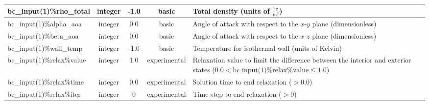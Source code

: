 \documentclass[letterpaper,10pt]{article}
\newcommand{\slbsc}{basic}
\newcommand{\slxtl}{experimental}
\newcommand{\typint}{integer}
\newcommand{\typflt}{integer}
\newcommand{\minorline}{\hline}
\newlength{\colEwidth}
\newcommand{\descriptionbegin}{}
\newcommand{\descriptionend}{\\ \minorline}
\begin{document}
\begin{longtable}{ | l | c | c | c | p{\colEwidth} | }
    bc\_input(1)\%rho\_total     & \typflt & -1.0  & \slbsc &
    \descriptionbegin
    Total density (units of $\frac{\textrm{kg}}{\textrm{m}^3}$)
    \descriptionend
    bc\_input(1)\%alpha\_aoa     & \typflt & 0.0   & \slbsc &
    \descriptionbegin
    Angle of attack with respect to the $x$-$y$ plane (dimensionless)
    \descriptionend
    bc\_input(1)\%beta\_aoa      & \typflt & 0.0   & \slbsc &
    \descriptionbegin
    Angle of attack with respect to the $x$-$z$ plane (dimensionless)
    \descriptionend
    bc\_input(1)\%wall\_temp     & \typflt & -1.0  & \slbsc &
    \descriptionbegin
    Temperature for isothermal wall (units of Kelvin)
    \descriptionend
    bc\_input(1)\%relax\%value   & \typflt & 1.0   & \slxtl &
    \descriptionbegin
    Relaxation value to limit the difference between the interior and exterior
    states ($0.0 < \textrm{bc\_input(1)\%relax\%value} \leq 1.0$)
    \descriptionend
    bc\_input(1)\%relax\%time    & \typflt & 0.0   & \slxtl &
    \descriptionbegin
    Solution time to end relaxation ($> 0.0$)
    \descriptionend
    bc\_input(1)\%relax\%iter    & \typint & 0     & \slxtl &
    \descriptionbegin
    Time step to end relaxation ($> 0$)
    \descriptionend



    \hline
    \end{longtable}

%
%
%
%
\end{document}
